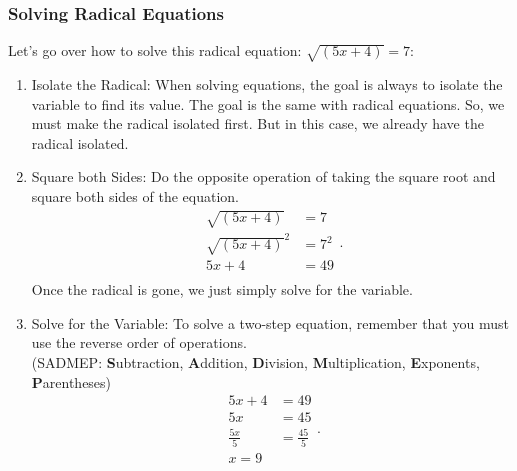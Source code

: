 
\subsubsection{Solving Radical Equations}
\label{sub_sub_sec:solving_radical_equations}

Let's go over how to solve this radical equation: $\sqrt{(5x + 4)} = 7$:

\begin{enumerate}
  \label{enum:solving_radical_equations}
  \item Isolate the Radical:
    When solving equations, the goal is always to isolate the variable to find
    its value. The goal is the same with radical equations. So, we must make the
    radical isolated first. But in this case, we already have the radical
    isolated.
  \item Square both Sides: Do the opposite operation of taking the square root
    and square both sides of the equation.
      \begin{equation}
        \label{eqt:solving_radical_equations_square_both_sides_1}
        \begin{split}
          \sqrt{(5x + 4)} &= 7 \\
          \sqrt{(5x + 4)}^{2} &= 7^{2} \\
          5x + 4 &= 49 \\
        \end{split}
      .\end{equation}
    Once the radical is gone, we just simply solve for the variable.
  \item Solve for the Variable: To solve a two-step equation, remember that you
    must use the reverse order of operations. \\
    (SADMEP: \textbf{S}ubtraction, \textbf{A}ddition, \textbf{D}ivision,
    \textbf{M}ultiplication, \textbf{E}xponents, \textbf{P}arentheses)
      \begin{equation}
        \label{eqt:solving_radical_equations_solve_for_variable_2}
        \begin{split}
          5x + 4  &= 49 \\
          5x      &= 45 \\
          \frac{5x}{5} &= \frac{45}{5} \\
          \boxed{x = 9}
        \end{split}
      .\end{equation}

\end{enumerate}
